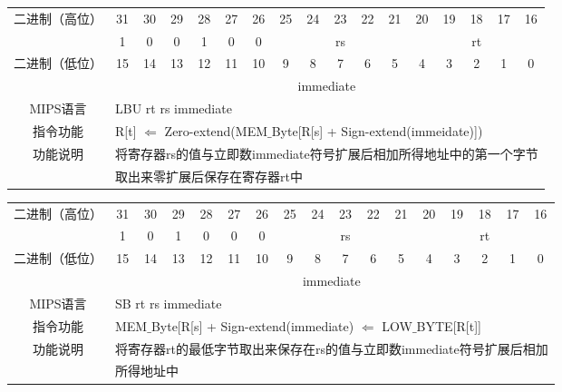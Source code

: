 \begin{table}
\begin{tabular}{|c|c|c|c|c|c|c|c|c|c|c|c|c|c|c|c|c|}
\hline
\multirow{2}{*}{二进制（高位）} &
31&30&29&28&27&26&25&24&23&22&21&20&19&18&17&16\\
\cline{2-17}
&
1&0&0&1&0&
0&
\multicolumn{5}{c|}{rs}&
\multicolumn{5}{c|}{rt}\\
\hline
\multirow{2}{*}{二进制（低位）} &
15&14&13&12&11&10&9&8&7&6&5&4&3&2&1&0\\
\cline{2-17}
&
\multicolumn{16}{c|}{immediate}\\
\hline
MIPS语言&
\multicolumn{16}{l|}{LBU rt rs immediate}\\
\hline
指令功能&
\multicolumn{16}{l|}{R[t] $\Leftarrow$ Zero-extend(MEM$\_$Byte[R[s] + Sign-extend(immeidate)])}\\
\hline
\multirow{2}{*}{功能说明}&
\multicolumn{16}{l|}{将寄存器rs的值与立即数immediate符号扩展后相加所得地址中的第一个字节}\\
&\multicolumn{16}{l|}{取出来零扩展后保存在寄存器rt中}\\
\hline
\end{tabular}
\end{table}

\begin{table}
\begin{tabular}{|c|c|c|c|c|c|c|c|c|c|c|c|c|c|c|c|c|}
\hline
\multirow{2}{*}{二进制（高位）} &
31&30&29&28&27&26&25&24&23&22&21&20&19&18&17&16\\
\cline{2-17}
&
1&0&1&0&0&
0&
\multicolumn{5}{c|}{rs}&
\multicolumn{5}{c|}{rt}\\
\hline
\multirow{2}{*}{二进制（低位）} &
15&14&13&12&11&10&9&8&7&6&5&4&3&2&1&0\\
\cline{2-17}
&
\multicolumn{16}{c|}{immediate}\\
\hline
MIPS语言&
\multicolumn{16}{l|}{SB rt rs immediate}\\
\hline
指令功能&
\multicolumn{16}{l|}{MEM$\_$Byte[R[s] + Sign-extend(immediate) $\Leftarrow$ LOW$\_$BYTE[R[t]]}\\
\hline
\multirow{2}{*}{功能说明}&
\multicolumn{16}{l|}{将寄存器rt的最低字节取出来保存在rs的值与立即数immediate符号扩展后相加}\\
&\multicolumn{16}{l|}{所得地址中}\\
\hline
\end{tabular}
\end{table}


